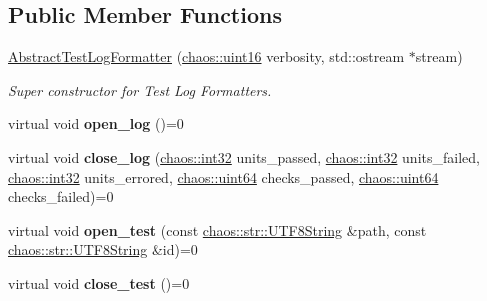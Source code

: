 \subsection*{Public Member Functions}
\begin{DoxyCompactItemize}
\item 
\hyperlink{classchaos_1_1test_1_1log__formatter_1_1_abstract_test_log_formatter_a9648fcc43ab62eb051d36da947d68830}{Abstract\+Test\+Log\+Formatter} (\hyperlink{namespacechaos_ac3888b1c9e56da7fbbdb3ab8425b4068}{chaos\+::uint16} verbosity, std\+::ostream $\ast$stream)
\begin{DoxyCompactList}\small\item\em Super constructor for Test Log Formatters. \end{DoxyCompactList}\item 
\hypertarget{classchaos_1_1test_1_1log__formatter_1_1_abstract_test_log_formatter_ae60e3b695f6c2a7e26944c1b0b644136}{}virtual void {\bfseries open\+\_\+log} ()=0\label{classchaos_1_1test_1_1log__formatter_1_1_abstract_test_log_formatter_ae60e3b695f6c2a7e26944c1b0b644136}

\item 
\hypertarget{classchaos_1_1test_1_1log__formatter_1_1_abstract_test_log_formatter_ae4e5e456db92f186ea5f8c452f3238e8}{}virtual void {\bfseries close\+\_\+log} (\hyperlink{namespacechaos_ad1de7efb430365afd2c9446a0f522a90}{chaos\+::int32} units\+\_\+passed, \hyperlink{namespacechaos_ad1de7efb430365afd2c9446a0f522a90}{chaos\+::int32} units\+\_\+failed, \hyperlink{namespacechaos_ad1de7efb430365afd2c9446a0f522a90}{chaos\+::int32} units\+\_\+errored, \hyperlink{namespacechaos_a34fe5f5bfc3ef6d80b5d094ed91b4d6e}{chaos\+::uint64} checks\+\_\+passed, \hyperlink{namespacechaos_a34fe5f5bfc3ef6d80b5d094ed91b4d6e}{chaos\+::uint64} checks\+\_\+failed)=0\label{classchaos_1_1test_1_1log__formatter_1_1_abstract_test_log_formatter_ae4e5e456db92f186ea5f8c452f3238e8}

\item 
\hypertarget{classchaos_1_1test_1_1log__formatter_1_1_abstract_test_log_formatter_a506782a79c28119c9286bcbe6d0df855}{}virtual void {\bfseries open\+\_\+test} (const \hyperlink{classchaos_1_1str_1_1_u_t_f8_string}{chaos\+::str\+::\+U\+T\+F8\+String} \&path, const \hyperlink{classchaos_1_1str_1_1_u_t_f8_string}{chaos\+::str\+::\+U\+T\+F8\+String} \&id)=0\label{classchaos_1_1test_1_1log__formatter_1_1_abstract_test_log_formatter_a506782a79c28119c9286bcbe6d0df855}

\item 
\hypertarget{classchaos_1_1test_1_1log__formatter_1_1_abstract_test_log_formatter_ae88303d5d75855ed7f65fd4e73387704}{}virtual void {\bfseries close\+\_\+test} ()=0\label{classchaos_1_1test_1_1log__formatter_1_1_abstract_test_log_formatter_ae88303d5d75855ed7f65fd4e73387704}


\end{DoxyCompactItemize}
